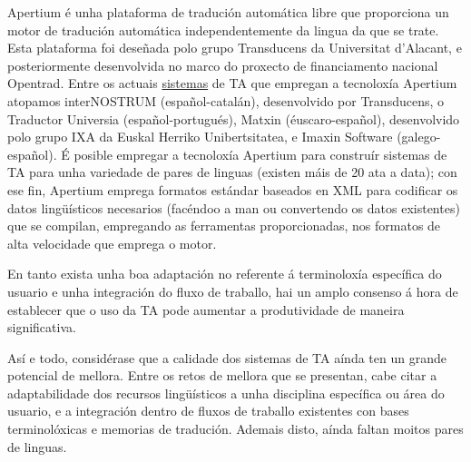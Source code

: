 \begin{multicols}{2}
Apertium é unha plataforma de tradución automática libre que proporciona un motor de tradución automática independentemente da lingua da que se trate. Esta plataforma foi deseñada polo grupo Transducens da Universitat d'Alacant, e posteriormente desenvolvida no marco do proxecto de financiamento nacional Opentrad. Entre os actuais \uline{sistemas} de TA que empregan a tecnoloxía Apertium atopamos interNOSTRUM (español-catalán), desenvolvido por Transducens, o Traductor Universia (español-portugués), Matxin (éuscaro-español), desenvolvido polo grupo IXA \cite{GAL-Nota33} da Euskal Herriko Unibertsitatea, e Imaxin Software (galego-español). É posible empregar a tecnoloxía Apertium para construír sistemas de TA para unha variedade de pares de linguas (existen máis de 20 ata a data); con ese fin, Apertium emprega formatos estándar baseados en XML para codificar os datos lingüísticos necesarios (facéndoo a man ou convertendo os datos existentes) que se compilan, empregando as ferramentas proporcionadas, nos formatos de alta velocidade que emprega o motor. 

En tanto exista unha boa adaptación no referente á terminoloxía específica do usuario e unha integración do fluxo de traballo, hai un amplo consenso á hora de establecer que o uso da TA pode aumentar a produtividade de maneira significativa. 

Así e todo, considérase que a calidade dos sistemas de TA aínda ten un grande potencial de mellora. Entre os retos de mellora que se presentan, cabe citar a adaptabilidade dos recursos lingüísticos a unha disciplina específica ou área do usuario, e a integración dentro de fluxos de traballo existentes con bases terminolóxicas e memorias de tradución. Ademais disto, aínda faltan moitos pares de linguas. 



\end{multicols}
